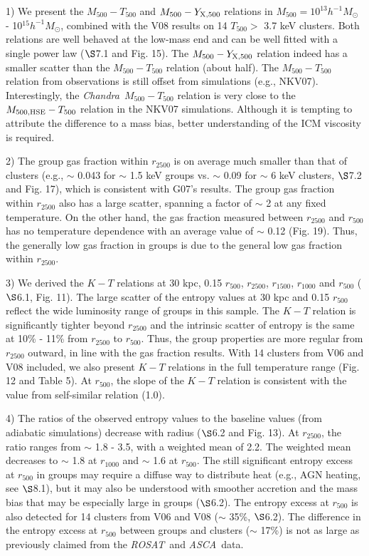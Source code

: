 \documentclass{aastex}
\def\asca       {{\em ASCA}\/}
\def\chandra    {{\em Chandra}\/}
\def\rosat      {{\em ROSAT}\/}
\begin{document}
1) We present the $M_{500} - T_{500}$ and $M_{500} - Y_{\rm X, 500}$ relations in
$M_{500} = 10^{13} h^{-1} M_{\odot}$ - 10$^{15} h^{-1} M_{\odot}$, combined
with the V08 results on 14 $T_{500} >$ 3.7 keV clusters. Both relations
are well behaved at the low-mass end and can be well fitted with a single power
law ($\S$7.1 and Fig. 15). The $M_{500} - Y_{\rm X, 500}$ relation indeed
has a smaller scatter than the $M_{500} - T_{500}$ relation (about half).
The $M_{500} - T_{500}$ relation from observations is still offset
from simulations (e.g., NKV07). Interestingly, the \chandra\ $M_{500} - T_{500}$ relation
is very close to the $M_{\rm 500, HSE} - T_{500}$ relation in the NKV07 simulations.
Although it is tempting to attribute the difference to a mass
bias, better understanding of the ICM viscosity is required.

2) The group gas fraction within $r_{2500}$ is on average much smaller than
that of clusters (e.g.,  $\sim$ 0.043 for $\sim$ 1.5 keV groups vs. $\sim$ 0.09
for $\sim$ 6 keV clusters, $\S$7.2 and Fig. 17), which is consistent with G07's
results. The group gas fraction within
$r_{2500}$ also has a large scatter, spanning a factor of $\sim$ 2 at any fixed
temperature. On the other hand, the gas fraction measured between $r_{2500}$ and
$r_{500}$ has no temperature dependence with an average value of
$\sim$ 0.12 (Fig. 19). Thus, the generally low gas
fraction in groups is due to the general low gas fraction within $r_{2500}$.

3) We derived the $K - T$ relations at 30 kpc, 0.15 $r_{500}$, $r_{2500}$,
$r_{1500}$, $r_{1000}$ and $r_{500}$ ($\S$6.1, Fig. 11). The large scatter of
the entropy values at 30 kpc
and 0.15 $r_{500}$ reflect the wide luminosity range of groups in this sample.
The $K - T$ relation is significantly tighter beyond $r_{2500}$ and the intrinsic
scatter of entropy is the same at 10\% - 11\% from $r_{2500}$ to $r_{500}$.
Thus, the group properties are more regular from $r_{2500}$ outward, in line with the
gas fraction results.
With 14 clusters from V06 and V08 included, we also present $K - T$ relations
in the full temperature range (Fig. 12 and Table 5). At $r_{500}$, the slope
of the $K - T$ relation is consistent with the value from self-similar
relation (1.0).

4) The ratios of the observed entropy values to the baseline values (from
adiabatic simulations) decrease with radius ($\S$6.2 and Fig. 13). At $r_{2500}$,
the ratio ranges
from $\sim$ 1.8 - 3.5, with a weighted mean of 2.2. The weighted mean decreases
to $\sim$ 1.8 at $r_{1000}$ and $\sim$ 1.6 at $r_{500}$. The still significant
entropy excess at $r_{500}$ in groups may require a diffuse way to distribute
heat (e.g., AGN heating, see $\S$8.1), but it may also be understood with smoother accretion
and the mass bias that may be especially large in groups ($\S$6.2).
The entropy excess at $r_{500}$ is also detected for 14 clusters from V06 and
V08 ($\sim$ 35\%, $\S$6.2). The difference in the entropy excess at $r_{500}$ between groups
and clusters ($\sim$ 17\%) is not as large as previously claimed from the \rosat\
and \asca\ data.
\end{document}
